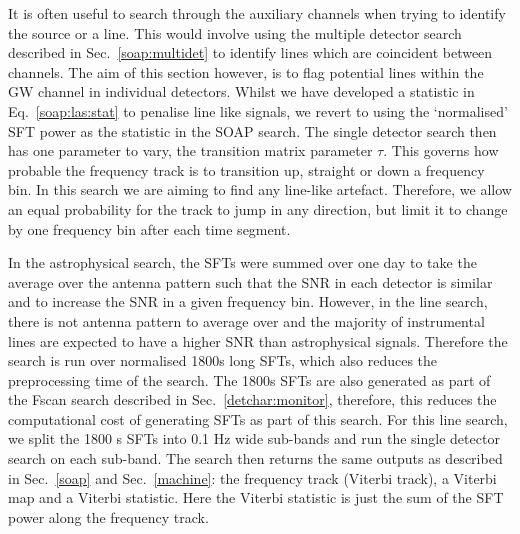It is often useful to search through the auxiliary channels when trying to
identify the source or a line. 
This would involve using the multiple detector search described in Sec.~\ref{soap:multidet} to identify lines which are coincident between channels. 
The aim of this section however, is to flag potential lines within the \gls{GW} channel in individual detectors.
Whilst we have developed a statistic in Eq.~\ref{soap:las:stat} to penalise line like signals, we revert to using the
`normalised' \gls{SFT} power as the statistic in the SOAP search. The single
detector search then has one parameter to vary, the transition matrix
parameter $\tau$.  This governs how probable the frequency track is to transition up,
straight or down a frequency bin.  In this search we are aiming to find any line-like artefact.
Therefore, we allow an equal probability for the track to jump in any
direction, but limit it to change by one frequency bin after each time
segment.  

In the astrophysical search, the \glspl{SFT} were summed over one day to take the average over the antenna pattern such that the \gls{SNR} in each detector is similar and to increase the \gls{SNR} in a given frequency bin.
However, in the line search, there is not antenna pattern to average over and the majority of instrumental lines are expected to have a higher \gls{SNR} than astrophysical signals.
Therefore the search is run over normalised 1800s long \glspl{SFT}, which also reduces the preprocessing time of the search.
The 1800s \glspl{SFT} are also generated as part of the Fscan search described in Sec.~\ref{detchar:monitor}, therefore, this reduces the computational cost of generating \glspl{SFT} as part of this search. 
For this line search, we split the 1800 s \glspl{SFT} into 0.1 Hz wide sub-bands and run the single detector search on each sub-band. 
The search then returns the same outputs as described in
Sec.~\ref{soap} and Sec.~\ref{machine}: the frequency track (Viterbi track), a
Viterbi map and a Viterbi statistic.  Here the Viterbi statistic is just the
sum of the \gls{SFT} power along the frequency track.  

